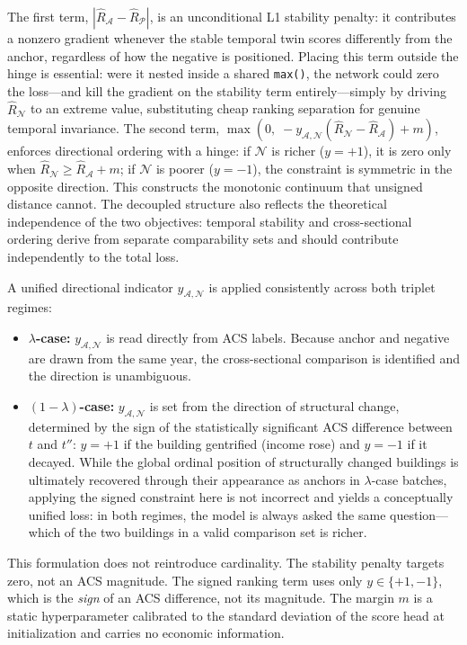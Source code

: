 \documentclass{article}
\begin{document}
The first term, $|\hat{R}_\mathcal{A} - \hat{R}_\mathcal{P}|$, is an unconditional L1 stability penalty: it contributes a nonzero gradient whenever the stable temporal twin scores differently from the anchor, regardless of how the negative is positioned. Placing this term outside the hinge is essential: were it nested inside a shared \texttt{max()}, the network could zero the loss---and kill the gradient on the stability term entirely---simply by driving $\hat{R}_\mathcal{N}$ to an extreme value, substituting cheap ranking separation for genuine temporal invariance. The second term, $\max(0,\; -y_{\mathcal{A},\mathcal{N}}(\hat{R}_\mathcal{N} - \hat{R}_\mathcal{A}) + m)$, enforces directional ordering with a hinge: if $\mathcal{N}$ is richer ($y = +1$), it is zero only when $\hat{R}_\mathcal{N} \geq \hat{R}_\mathcal{A} + m$; if $\mathcal{N}$ is poorer ($y = -1$), the constraint is symmetric in the opposite direction. This constructs the monotonic continuum that unsigned distance cannot. The decoupled structure also reflects the theoretical independence of the two objectives: temporal stability and cross-sectional ordering derive from separate comparability sets and should contribute independently to the total loss.

A unified directional indicator $y_{\mathcal{A},\mathcal{N}}$ is applied consistently across both triplet regimes:
\begin{itemize}
    \item \textbf{$\lambda$-case:} $y_{\mathcal{A},\mathcal{N}}$ is read directly from ACS labels. Because anchor and negative are drawn from the same year, the cross-sectional comparison is identified and the direction is unambiguous.
    \item \textbf{$(1-\lambda)$-case:} $y_{\mathcal{A},\mathcal{N}}$ is set from the direction of structural change, determined by the sign of the statistically significant ACS difference between $t$ and $t''$: $y = +1$ if the building gentrified (income rose) and $y = -1$ if it decayed. While the global ordinal position of structurally changed buildings is ultimately recovered through their appearance as anchors in $\lambda$-case batches, applying the signed constraint here is not incorrect and yields a conceptually unified loss: in both regimes, the model is always asked the same question---which of the two buildings in a valid comparison set is richer.
\end{itemize}

This formulation does not reintroduce cardinality. The stability penalty targets zero, not an ACS magnitude. The signed ranking term uses only $y \in \{+1, -1\}$, which is the \textit{sign} of an ACS difference, not its magnitude. The margin $m$ is a static hyperparameter calibrated to the standard deviation of the score head at initialization and carries no economic information.
\end{document}
